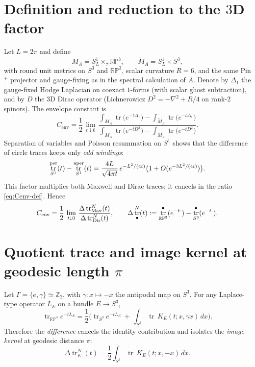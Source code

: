 \documentclass[11pt]{article}
\theoremstyle{definition}
\theoremstyle{remark}
\DeclareMathOperator{\tr}{tr}
\begin{document}
\section{Definition and reduction to the $3$D factor}
Let $L=2\pi$ and define
\[
M_A=S^1_L\times_{\tau}\mathbb{RP}^3,\qquad \widetilde M_A=S^1_L\times S^3,
\]
with round unit metrics on $S^3$ and $\mathbb{RP}^3$, scalar curvature $R=6$, and the same Pin$^+$ projector and gauge-fixing as in the spectral calculation of $A$. Denote by $\Delta_1$ the gauge-fixed Hodge Laplacian on coexact $1$-forms (with scalar ghost subtraction), and by $D$ the 3D Dirac operator (Lichnerowicz $D^2=-\nabla^2+R/4$ on rank-$2$ spinors). The envelope constant is
\begin{equation}\label{eq:Cenv-def}
C_{\mathrm{env}}=\frac{1}{2}\,\lim_{t\downarrow 0}\,
\frac{\displaystyle \int_{M_A}\!\tr\big(e^{-t\Delta_{1}}\big)-\int_{\widetilde M_A}\!\tr\big(e^{-t\Delta_{1}}\big)}
{\displaystyle \int_{M_A}\!\tr\big(e^{-t D^2}\big)-\int_{\widetilde M_A}\!\tr\big(e^{-t D^2}\big)}.
\end{equation}
Separation of variables and Poisson resummation on $S^1$ shows that the difference of circle traces keeps only \emph{odd windings}:
\[
\tr_{S^1}^{\rm per}(t)-\tr_{S^1}^{\rm aper}(t)=\frac{4L}{\sqrt{4\pi t}}\,e^{-L^2/(4t)}\big(1+O(e^{-3L^2/(4t)})\big).
\]
This factor multiplies both Maxwell and Dirac traces; it cancels in the ratio \eqref{eq:Cenv-def}. Hence
\begin{equation}\label{eq:Cenv-3D}
C_{\mathrm{env}}=\frac{1}{2}\,\lim_{t\downarrow 0}\,\frac{\Delta \tr^{N}_{\rm Max}(t)}{\Delta \tr^{N}_{\rm Dir}(t)},
\qquad \Delta \tr^{N}_{\bullet}(t):=\tr_{\mathbb{RP}^3}^{\bullet}(e^{-t\cdot})-\tr_{S^3}^{\bullet}(e^{-t\cdot}).
\end{equation}

\section{Quotient trace and image kernel at geodesic length $\pi$}
Let $\Gamma=\{e,\gamma\}\simeq\mathbb{Z}_2$, with $\gamma:x\mapsto -x$ the antipodal map on $S^3$. For any Laplace-type operator $L_E$ on a bundle $E\to S^3$,
\begin{equation}\label{eq:orbifold-trace}
\tr_{\mathbb{RP}^3}e^{-tL_E}
=\frac{1}{2}\Big(\tr_{S^3}e^{-tL_E}\ +\ \int_{S^3}\tr\,K_E(t;x,\gamma x)\,dx\Big).
\end{equation}
Therefore the \emph{difference} cancels the identity contribution and isolates the \emph{image kernel} at geodesic distance $\pi$:
\begin{equation}\label{eq:delta-3D}
\Delta \tr^{N}_E(t)=\frac{1}{2}\int_{S^3}\tr\,K_E(t;x,-x)\,dx.
\end{equation}
\end{document}
